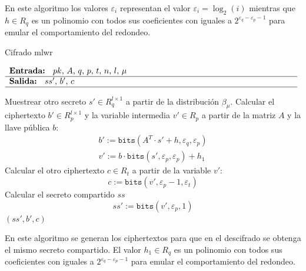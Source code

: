 En este algoritmo los valores $\varepsilon_i$ representan el valor \(\varepsilon_i=\log_2 (i)\) mientras que \(h\in  R_q\) es un polinomio con todos sus coeficientes con iguales a \(2^{\varepsilon_q-\varepsilon_p-1}\) para emular el comportamiento del redondeo.

\begin{algorithm}[H]
	\caption{Cifrado \gls{mlwr}} 
	$\begin{array}{p{\textwidth}}
		\textbf{Entrada: } \(pk\), \(A\), \(q\), \(p\), \(t\), \(n\), \(l\), \(\mu\)\\ 
		\hline
		\textbf{Salida: } \(ss'\), \(b'\), \(c\) \\ 
		\hline
	\end{array}$
	\begin{algorithmic}[1]
		\State Muestrear otro secreto \(s'\in R_q^{l\times 1}\) a partir de la distribución \(\beta_\mu\).	
		\State	Calcular el ciphertexto \(b' \in R_p^{l\times 1}\) y la variable intermedia \(v'\in R_p\) a partir de la matriz \(A\) y la llave pública \(b\):
		\begin{equation}
			\begin{array}{l}
				b':=\texttt{bits}(A^T\cdot s'+h,\varepsilon_q,\varepsilon_p) \\
				v':=b \cdot \texttt{bits}(s',\varepsilon_p,\varepsilon_p)+ h_1 
			\end{array}
		\end{equation}
		\State Calcular el otro ciphertexto \(c\in R_t\) a partir de la variable \(v'\):
		\begin{equation}
			c:=\texttt{bits}(v',\varepsilon_p -1,\varepsilon_t)
		\end{equation}
		\State Calcular el secreto compartido \(ss\)
		\begin{equation}
			ss':=\texttt{bits}(v',\varepsilon_p,1)
		\end{equation}
		\State \Return \((ss', b', c)\)
	\end{algorithmic}
\end{algorithm}

En este algoritmo se generan los ciphertextos para que en el descifrado se obtenga el mismo secreto compartido. El valor \(h_1\in  R_q\) es un polinomio con todos sus coeficientes con iguales a \(2^{\varepsilon_q-\varepsilon_p-1}\) para emular el comportamiento del redondeo.

